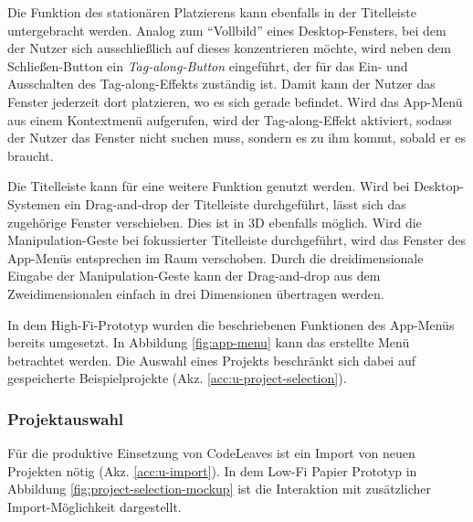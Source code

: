 Die Funktion des stationären Platzierens kann ebenfalls in der Titelleiste untergebracht werden. Analog zum "`Vollbild"' eines Desktop-Fensters, bei dem der Nutzer sich ausschließlich auf dieses konzentrieren möchte, wird neben dem Schließen-Button ein \textit{Tag-along-Button} eingeführt, der für das Ein- und Ausschalten des Tag-along-Effekts zuständig ist. Damit kann der Nutzer das Fenster jederzeit dort platzieren, wo es sich gerade befindet. Wird das App-Menü aus einem Kontextmenü aufgerufen, wird der Tag-along-Effekt aktiviert, sodass der Nutzer das Fenster nicht suchen muss, sondern es zu ihm kommt, sobald er es braucht.

Die Titelleiste kann für eine weitere Funktion genutzt werden. Wird bei Desktop-Systemen ein Drag-and-drop der Titelleiste durchgeführt, lässt sich das zugehörige Fenster verschieben. Dies ist in 3D ebenfalls möglich. Wird die Manipulation-Geste bei fokussierter Titelleiste durchgeführt, wird das Fenster des App-Menüs entsprechen im Raum verschoben. Durch die dreidimensionale Eingabe der Manipulation-Geste kann der Drag-and-drop aus dem Zweidimensionalen einfach in drei Dimensionen übertragen werden.

In dem High-Fi-Prototyp wurden die beschriebenen Funktionen des App-Menüs bereits umgesetzt. In Abbildung \ref{fig:app-menu} kann das erstellte Menü betrachtet werden. Die Auswahl eines Projekts beschränkt sich dabei auf gespeicherte Beispielprojekte (Akz. \ref{acc:u-project-selection}).

\subsubsection*{Projektauswahl}

Für die produktive Einsetzung von CodeLeaves ist ein Import von neuen Projekten nötig (Akz. \ref{acc:u-import}). In dem Low-Fi Papier Prototyp in Abbildung \ref{fig:project-selection-mockup} ist die Interaktion mit zusätzlicher Import-Möglichkeit dargestellt.

